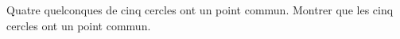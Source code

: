 Quatre quelconques de cinq cercles ont un point commun. Montrer que les cinq cercles ont un point commun.
